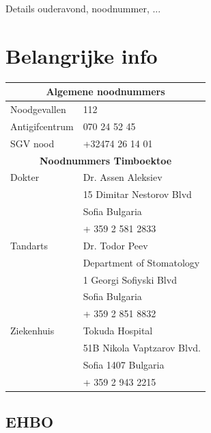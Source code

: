 \documentclass[fleqn,10pt]{src/KampSjabloon}
\newcommand{\kampplaats}{Timboektoe}
\begin{document}
Details ouderavond, noodnummer, ...


\section{Belangrijke info}

\begin{table}[H]
\centering
\begin{tabularx}{8.5cm}{lX}
\toprule
\multicolumn{2}{c}{\textbf{Algemene noodnummers}} \\
\toprule

Noodgevallen & 112\\
Antigifcentrum & 070 24 52 45\\
SGV nood & +32474 26 14 01\\

\bottomrule
\multicolumn{2}{c}{\textbf{Noodnummers \kampplaats}} \\
\toprule

Dokter  & Dr. Assen Aleksiev\\
        & 15 Dimitar Nestorov Blvd \\
        & Sofia  Bulgaria \\
        & + 359 2 581 2833\\

Tandarts  & Dr. Todor Peev \\
          & Department of Stomatology \\
          & 1 Georgi Sofiyski Blvd \\
          & Sofia Bulgaria \\
          & + 359 2 851 8832 \\

Ziekenhuis & Tokuda Hospital\\
		   &51B Nikola Vaptzarov Blvd. \\
           &Sofia 1407 Bulgaria \\
           &+ 359 2 943 2215\\

\bottomrule
\end{tabularx}
\label{tab:label}
\end{table}

\subsection*{EHBO}
\end{document}
